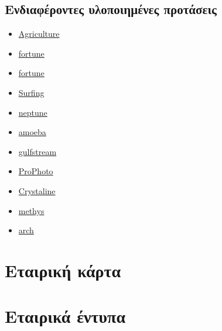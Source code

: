 \documentclass[a4paper, 12pt, twoside]{report}
\begin{document}
		\section{Ενδιαφέροντες υλοποιημένες προτάσεις}
			\begin{itemize}
				\item \href{http://www.templatemonster.com/demo/39989.html}{Agriculture}
				\item \href{http://www.templatemonster.com/demo/39987.html}{fortune}
				\item \href{http://www.templatemonster.com/demo/39985.html}{fortune}
				\item \href{http://www.templatemonster.com/demo/39988.html}{Surfing}
				\item \href{http://www.themeshark.com/demo/neptune/}{neptune}
				\item \href{http://www.themeshark.com/demo/amoeba/}{amoeba}
				\item \href{http://www.themeshark.com/demo/gulfstream/}{gulfstream}
				\item \href{http://switcher.sooperthemes.com/?theme=prophoto}{ProPhoto}
				\item \href{http://demo.rockettheme.com/drupal/?theme=crystalline}{Crystaline}
				\item \href{http://demo.themebrain.com/#methys_ii}{methys}
				\item \href{http://www.templatemonster.com/demo/39138.html}{arch}
				\end{itemize}
	
	\chapter{Εταιρική κάρτα}
	
	\chapter{Εταιρικά έντυπα}
		
	
	
	
		
		
		

	\cleardoublepage
	\label{κεφ.:Βιβλιογραφία}
	\printbibliography[title={Βιβλιογραφία}]
	
\end{document}
